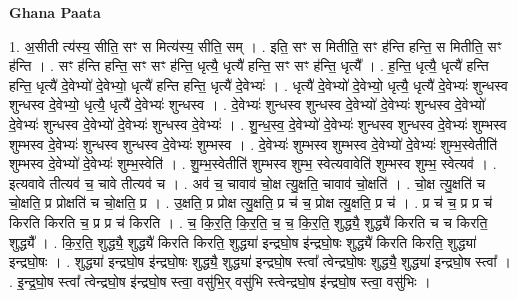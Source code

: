 \documentclass[17pt]{extarticle}
\begin{document}
\textbf{Ghana Paata } \newline

1. अ॒सीती त्य॑स्य॒ सीति॒ सꣳ स मित्य॑स्य॒ सीति॒ सम् । . इति॒ सꣳ स मितीति॒ सꣳ ह॑न्ति हन्ति॒ स मितीति॒ सꣳ ह॑न्ति । . सꣳ ह॑न्ति हन्ति॒ सꣳ सꣳ ह॑न्ति॒ धृत्यै॒ धृत्यै॑ हन्ति॒ सꣳ सꣳ ह॑न्ति॒ धृत्यै᳚ । . ह॒न्ति॒ धृत्यै॒ धृत्यै॑ हन्ति हन्ति॒ धृत्यै॑ दे॒वेभ्यो॑ दे॒वेभ्यो॒ धृत्यै॑ हन्ति हन्ति॒ धृत्यै॑ दे॒वेभ्यः॑ । . धृत्यै॑ दे॒वेभ्यो॑ दे॒वेभ्यो॒ धृत्यै॒ धृत्यै॑ दे॒वेभ्यः॑ शुन्धस्व शुन्धस्व दे॒वेभ्यो॒ धृत्यै॒ धृत्यै॑ दे॒वेभ्यः॑ शुन्धस्व । . दे॒वेभ्यः॑ शुन्धस्व शुन्धस्व दे॒वेभ्यो॑ दे॒वेभ्यः॑ शुन्धस्व दे॒वेभ्यो॑ दे॒वेभ्यः॑ शुन्धस्व दे॒वेभ्यो॑ दे॒वेभ्यः॑ शुन्धस्व दे॒वेभ्यः॑ । . शु॒न्ध॒स्व॒ दे॒वेभ्यो॑ दे॒वेभ्यः॑ शुन्धस्व शुन्धस्व दे॒वेभ्यः॑ शुम्भस्व शुम्भस्व दे॒वेभ्यः॑ शुन्धस्व शुन्धस्व दे॒वेभ्यः॑ शुम्भस्व । . दे॒वेभ्यः॑ शुम्भस्व शुम्भस्व दे॒वेभ्यो॑ दे॒वेभ्यः॑ शुम्भ॒स्वेतीति॑ शुम्भस्व दे॒वेभ्यो॑ दे॒वेभ्यः॑ शुम्भ॒स्वेति॑ । . शु॒म्भ॒स्वेतीति॑ शुम्भस्व शुम्भ॒ स्वेत्यवावेति॑ शुम्भस्व शुम्भ॒ स्वेत्यव॑ । . इत्यवावे तीत्यव॑ च॒ चावे तीत्यव॑ च । . अव॑ च॒ चावाव॑ चो॒क्ष त्यु॒क्षति॒ चावाव॑ चो॒क्षति॑ । . चो॒क्ष त्यु॒क्षति॑ च चो॒क्षति॒ प्र प्रोक्षति॑ च चो॒क्षति॒ प्र । . उ॒क्षति॒ प्र प्रोक्ष त्यु॒क्षति॒ प्र च॑ च॒ प्रोक्ष त्यु॒क्षति॒ प्र च॑ । . प्र च॑ च॒ प्र प्र च॑ किरति किरति च॒ प्र प्र च॑ किरति । . च॒ कि॒र॒ति॒ कि॒र॒ति॒ च॒ च॒ कि॒र॒ति॒ शुद्ध्यै॒ शुद्ध्यै॑ किरति च च किरति॒ शुद्ध्यै᳚ । . कि॒र॒ति॒ शुद्ध्यै॒ शुद्ध्यै॑ किरति किरति॒ शुद्ध्या॑ इन्द्रघो॒ष इ॑न्द्रघो॒षः शुद्ध्यै॑ किरति किरति॒ शुद्ध्या॑ इन्द्रघो॒षः । . शुद्ध्या॑ इन्द्रघो॒ष इ॑न्द्रघो॒षः शुद्ध्यै॒ शुद्ध्या॑ इन्द्रघो॒ष स्त्वा᳚ त्वेन्द्रघो॒षः शुद्ध्यै॒ शुद्ध्या॑ इन्द्रघो॒ष स्त्वा᳚ । . इ॒न्द्र॒घो॒ष स्त्वा᳚ त्वेन्द्रघो॒ष इ॑न्द्रघो॒ष स्त्वा॒ वसु॑भि॒र् वसु॑भि स्त्वेन्द्रघो॒ष इ॑न्द्रघो॒ष स्त्वा॒ वसु॑भिः । \newline
\end{document}
